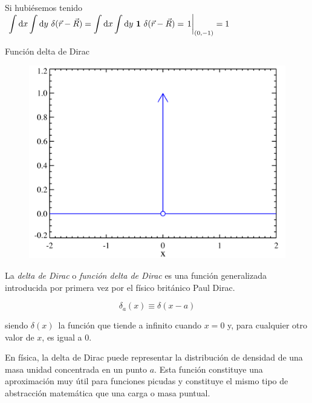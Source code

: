 \vspace{5mm} Si hubiésemos tenido  $\ \displaystyle \int \dd x \int \dd y \ \delta(\vec r-\vec R)=\int \dd x \int \dd y \ \boldsymbol 1 \ \delta(\vec r-\vec R)=\eval{1}_{(0,-1)}=1$




\newpage
\begin{myexampleblock}{Función delta de Dirac}
	
	\begin{figure} %
    \centering
    \includegraphics[width=.95\linewidth]{imagenes/img36-03.png} %
    \label{T36fig-deltaD}
\end{figure}

La \emph{delta de Dirac} o  \emph{función delta de Dirac} es una función generalizada introducida por primera vez por el físico británico Paul Dirac.

$$ \delta_{a}(x)\equiv \delta (x-a)$$

siendo  $ \delta (x)\,$ la función que tiende a infinito cuando $x=0$ y, para cualquier otro valor de $x$, es igual a $0$.

\vspace{2mm} En física, la delta de Dirac puede representar la distribución de densidad de una masa unidad concentrada en un punto $a$. Esta función constituye una aproximación muy útil para funciones picudas y constituye el mismo tipo de abstracción matemática que una carga o masa puntual. 

\end{myexampleblock}



